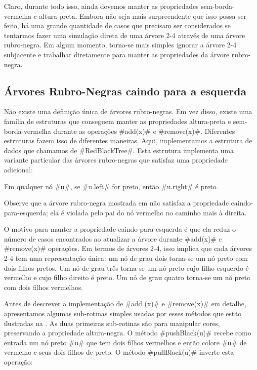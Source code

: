 Claro, durante todo isso, ainda devemos manter as propriedades sem-borda-vermelha
e altura-preta. Embora não seja mais surpreendente que isso possa ser feito,
há uma grande quantidade de casos que precisam ser considerados se tentarmos 
fazer uma simulação direta de uma árvore 2-4 através de uma
árvore rubro-negra. Em algum momento, torna-se mais simples ignorar a
árvore 2-4 subjacente e trabalhar diretamente para manter as propriedades
da árvore rubro-negra.

\subsection{Árvores Rubro-Negras caindo para a esquerda}

%
%
Não existe uma definição única de árvores rubro-negras. Em vez disso, existe
uma família de estruturas que conseguem manter as propriedades altura-preta
e sem-borda-vermelha durante as operações #add(x)# e #remove(x)#. 
Diferentes estruturas fazem isso de diferentes maneiras.
Aqui, implementamos a estrutura de dados que chamamos de #RedBlackTree#.
%
Esta estrutura implementa uma variante particular das árvores rubro-negras que
satisfaz uma propriedade adicional:
\begin{prp}
	Em qualquer nó #u#, se #u.left# for preto, então #u.right# é preto.
\end{prp}
Observe que a árvore rubro-negra mostrada em  não
satisfaz a propriedade caindo-para-esquerda; ela é violada pelo pai do
nó vermelho no caminho mais à direita.

O motivo para manter a propriedade caindo-para-esquerda é que ela reduz
o número de casos encontrados ao atualizar a árvore durante #add(x)#
e #remove(x)# operações. Em termos de árvores 2-4, isso implica que cada
árvores 2-4 tem uma representação única: um nó de grau dois torna-se
um nó preto com dois filhos pretos. Um nó de grau três torna-se
um nó preto cujo filho esquerdo é vermelho e cujo filho direito é preto.
Um nó de grau quatro torna-se um nó preto com dois filhos vermelhos.

Antes de descrever a implementação de #add (x)# e #remove(x)# em
detalhe, apresentamos algumas sub-rotinas simples usadas por esses métodos
que estão ilustradas na . As duas primeiras
sub-rotinas são para manipular cores, preservando a propriedade altura-negra.
O método #pushBlack(u)# recebe como entrada um nó preto #u#
que tem dois filhos vermelhos e então colore #u# de vermelho e seus dois filhos 
de preto. O método #pullBlack(u)# inverte esta operação:

